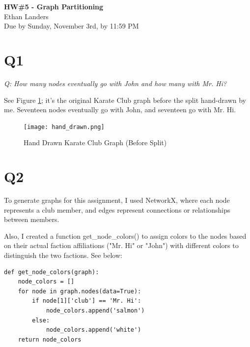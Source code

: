 \documentclass[12pt]{article}
\begin{document}
\begin{centering}
{\large\textbf{HW\#5 - Graph Partitioning}}\\ 
Ethan Landers\\
Due by Sunday, November 3rd, by 11:59 PM\\
\end{centering}


\section*{Q1}

\emph{Q: How many nodes eventually go with John and how many with Mr. Hi?}

See Figure \ref{fig:hand_drawn}; it's the original Karate Club graph before the split hand-drawn by me. Seventeen nodes eventually go with John, and seventeen go with Mr. Hi.

\begin{figure}
    \centering
    \texttt{[image: hand\_drawn.png]}
    \caption{Hand Drawn Karate Club Graph (Before Split)}
    \label{fig:hand_drawn}
\end{figure}


\section*{Q2}

To generate graphs for this assignment, I used NetworkX, where each node represents a club member, and edges represent connections or relationships between members.

Also, I created a function get\_node\_colors() to assign colors to the nodes based on their actual faction affiliations ("Mr. Hi" or "John") with different colors to distinguish the two factions. See below:

\begin{lstlisting}
def get_node_colors(graph):
    node_colors = []
    for node in graph.nodes(data=True):
        if node[1]['club'] == 'Mr. Hi':
            node_colors.append('salmon')
        else:
            node_colors.append('white')
    return node_colors
\end{lstlisting}
\end{document}
